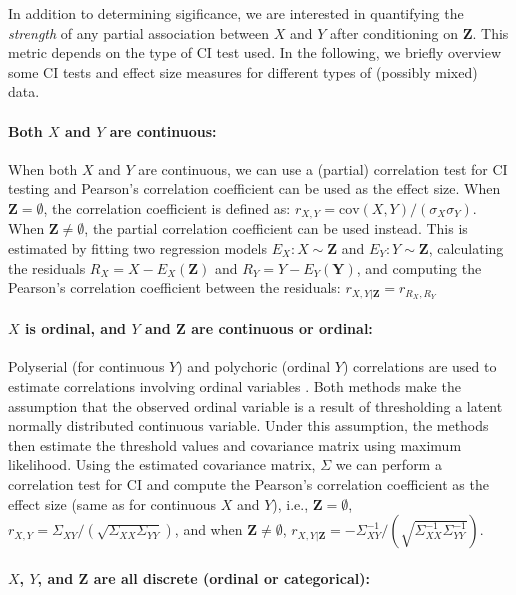 \documentclass[accepted]{uai2025} %
\begin{document}
In addition to determining sigificance, we are interested in quantifying the 
\emph{strength} of any partial association between $X$ and $Y$ after conditioning 
on $\mathbf{Z}$. This metric depends on the type of CI test used. In the following,
we briefly overview some CI tests and effect size measures
for different types of (possibly mixed) data.

\paragraph{Both $ X $ and $ Y $ are continuous: }
When both $ X $ and $ Y $ are continuous, we can use a (partial) correlation
test for CI testing and Pearson's correlation coefficient can be used as the
effect size. When $ \bm{Z} = \emptyset $, the correlation coefficient is
defined as: $ r_{X, Y} = \mathrm{cov}(X, Y) / (\sigma_X \sigma_Y) $. When $
\bm{Z} \neq \emptyset $, the partial correlation coefficient can be used instead.
This is estimated by fitting two regression models $ E_X: X \sim \bm{Z} $ and $ E_Y: Y
\sim \bm{Z} $, calculating the residuals $ R_X = X - E_X(\bm{Z}) $ and $ R_Y =
Y - E_Y(\bm{Y}) $, and computing the Pearson's correlation coefficient between the
residuals: $r_{X, Y \rvert \bm{Z}} = r_{R_X, R_Y}$

\paragraph{$ X $ is ordinal, and $ Y $ and $ \bm{Z} $  are continuous or ordinal: }

Polyserial (for continuous $Y$) and polychoric
(ordinal $Y$) correlations are used to estimate correlations 
involving ordinal variables \citep{Poon1987}. Both methods make the assumption that the
observed ordinal variable is a result of thresholding a latent normally
distributed continuous variable. Under this assumption, the methods then 
estimate the threshold values and covariance matrix using maximum likelihood.
Using the estimated covariance matrix, $ \Sigma $ we can perform a correlation
test for CI and compute the Pearson's correlation coefficient as the effect
size (same as for continuous $ X $ and $ Y $), i.e., 
$\bm{Z} = \emptyset $, $ r_{X, Y} = \Sigma_{XY} / (\sqrt{\Sigma_{XX} \Sigma_{YY}}) $, 
	and when $ \bm{Z} \ne \emptyset $,
	$ r_{X, Y \rvert \bm{Z}} = - \Sigma^{-1}_{XY}/ (\sqrt{\Sigma^{-1}_{XX} \Sigma^{-1}_{YY}}) $.

\paragraph{$ X $, $ Y $, and $ \bm{Z} $ are all discrete (ordinal or categorical): }
\end{document}
